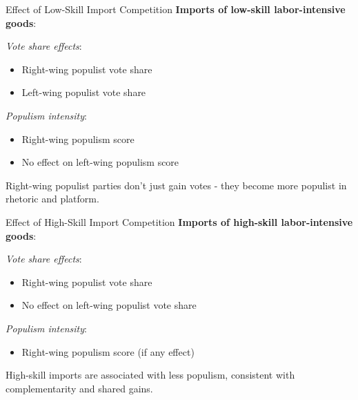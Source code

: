 \documentclass{beamer}
\begin{document}
\begin{frame}{Effect of Low-Skill Import Competition}
\textbf{Imports of low-skill labor-intensive goods}:
\vspace{0.3cm}

\textit{Vote share effects}:
\begin{itemize}
    \item[$\uparrow$] Right-wing populist vote share
    \item[$\uparrow$] Left-wing populist vote share
\end{itemize}
\vspace{0.3cm}
\textit{Populism intensity}:
\begin{itemize}
    \item[$\uparrow$] Right-wing populism score
    \item No effect on left-wing populism score
\end{itemize}
\vspace{0.3cm}
Right-wing populist parties don't just gain votes - they become more populist in rhetoric and platform.
\end{frame}

\begin{frame}{Effect of High-Skill Import Competition}
\textbf{Imports of high-skill labor-intensive goods}:
\vspace{0.3cm}

\textit{Vote share effects}:
\begin{itemize}
    \item[$\downarrow$] Right-wing populist vote share
    \item No effect on left-wing populist vote share
\end{itemize}
\vspace{0.3cm}
\textit{Populism intensity}:
\begin{itemize}
    \item[$\downarrow$] Right-wing populism score (if any effect)
\end{itemize}
\vspace{0.3cm}
High-skill imports are associated with less populism, consistent with complementarity and shared gains.
\end{frame}
\end{document}
